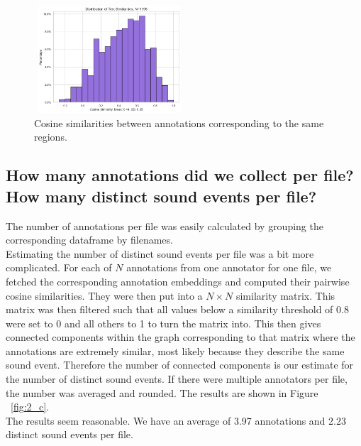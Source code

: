 \begin{figure}[htbp]
  \centering
  \includegraphics[width=0.5\textwidth, height=4cm]{figs/sim_diffs.png}
  \caption{Cosine similarities between annotations corresponding to the same regions.}
  \label{fig:2_b}
\end{figure}

\subsection{How many annotations did we collect per file? How many distinct sound events per file?}
\label{sec:Annotation Quality:a2}
The number of annotations per file was easily calculated by grouping the corresponding dataframe by filenames.\\
Estimating the number of distinct sound events per file was a bit more complicated. For each of $N$ annotations from one annotator for one file, we fetched the corresponding annotation embeddings and computed their pairwise cosine similarities. They were then put into a $N \times N$ similarity matrix. This matrix was then filtered such that all values below a similarity threshold of 0.8 were set to 0 and all others to 1 to turn the matrix into. This then gives connected components within the graph corresponding to that matrix where the annotations are extremely similar, most likely because they describe the same sound event. Therefore the number of connected components is our estimate for the number of distinct sound events. If there were multiple annotators per file, the number was averaged and rounded. The results are shown in Figure ~\ref{fig:2_c}. \\
The results seem reasonable. We have an average of 3.97 annotations and 2.23 distinct sound events per file.

